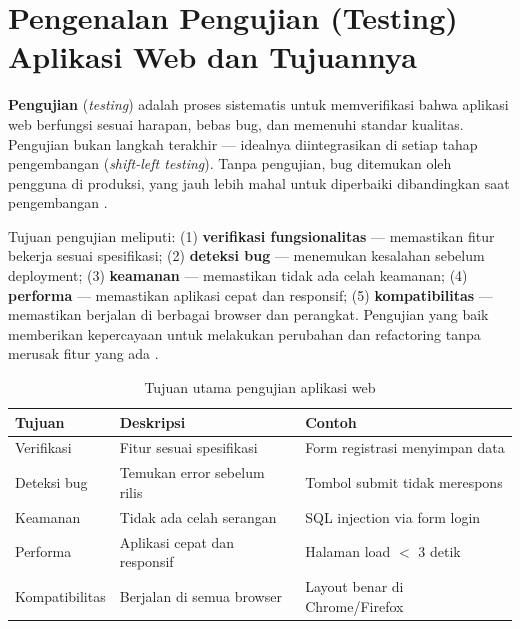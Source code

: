 ﻿\section{Pengenalan Pengujian (Testing) Aplikasi Web dan Tujuannya}

\textbf{Pengujian} (\textit{testing}) adalah proses sistematis untuk memverifikasi bahwa aplikasi web berfungsi sesuai harapan, bebas bug, dan memenuhi standar kualitas. Pengujian bukan langkah terakhir --- idealnya diintegrasikan di setiap tahap pengembangan (\textit{shift-left testing}). Tanpa pengujian, bug ditemukan oleh pengguna di produksi, yang jauh lebih mahal untuk diperbaiki dibandingkan saat pengembangan \cite{mdnToolsTesting}.

Tujuan pengujian meliputi: (1) \textbf{verifikasi fungsionalitas} --- memastikan fitur bekerja sesuai spesifikasi; (2) \textbf{deteksi bug} --- menemukan kesalahan sebelum deployment; (3) \textbf{keamanan} --- memastikan tidak ada celah keamanan; (4) \textbf{performa} --- memastikan aplikasi cepat dan responsif; (5) \textbf{kompatibilitas} --- memastikan berjalan di berbagai browser dan perangkat. Pengujian yang baik memberikan kepercayaan untuk melakukan perubahan dan refactoring tanpa merusak fitur yang ada \cite{mdnToolsTesting}.

\begin{table}[H]
\centering
\begin{tabular}{|P{3cm}|P{4.5cm}|P{5cm}|}
\hline
\textbf{Tujuan} & \textbf{Deskripsi} & \textbf{Contoh} \\
\hline
Verifikasi & Fitur sesuai spesifikasi & Form registrasi menyimpan data \\
\hline
Deteksi bug & Temukan error sebelum rilis & Tombol submit tidak merespons \\
\hline
Keamanan & Tidak ada celah serangan & SQL injection via form login \\
\hline
Performa & Aplikasi cepat dan responsif & Halaman load $<$ 3 detik \\
\hline
Kompatibilitas & Berjalan di semua browser & Layout benar di Chrome/Firefox \\
\hline
\end{tabular}
\caption{Tujuan utama pengujian aplikasi web}
\end{table}


